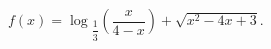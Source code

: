 \begin{ex}[type=inequality]
	\begin{condition}
		$f(x) = \log$\tiny$_{\dfrac{1}{3}}$\normalsize$\left(\dfrac{x}{4 - x}\right) + \sqrt{x^2 - 4x  + 3}.$
	\end{condition}
	\answer{ $ x \in(0;1]\cup[3;4).$}
\end{ex}